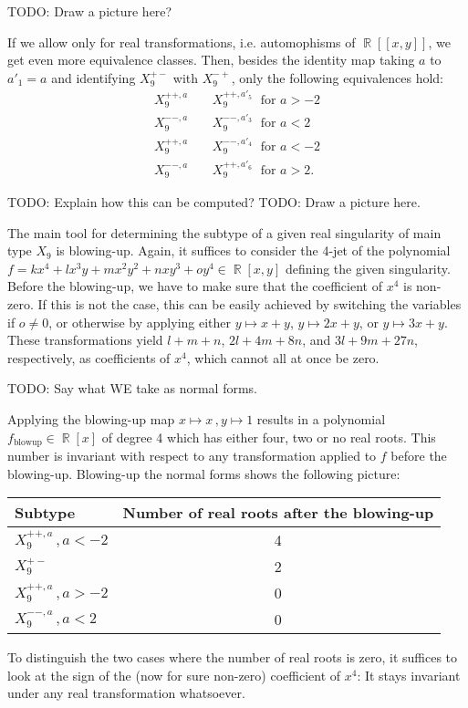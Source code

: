 \documentclass[noend]{amsproc}
\theoremstyle{definition}
\DeclareMathOperator{\requiv}{\overset{r}{\sim}}
\DeclareMathOperator{\R}{\mathbb{R}}
\begin{document}
TODO: Draw a picture here?

If we allow only for real transformations, i.e. automophisms of $\R[[x,y]]$,
we get even more equivalence classes. Then, besides the identity map taking $a$
to $a'_1=a$ and identifying $X_9^{+-}$ with $X_9^{-+}$,
only the following equivalences hold:
\begin{align}
X_9^{++,a} \; &\requiv \; X_9^{++,a'_5} \; \text{ for } a > -2 \\
X_9^{--,a} \; &\requiv \; X_9^{--,a'_3} \; \text{ for } a < 2 \\
X_9^{++,a} \; &\requiv \; X_9^{--,a'_4} \; \text{ for } a < -2 \\
X_9^{--,a} \; &\requiv \; X_9^{++,a'_6} \; \text{ for } a > 2.
\end{align}

TODO: Explain how this can be computed?
TODO: Draw a picture here.

The main tool for determining the subtype of a given real singularity of main
type $X_9$ is blowing-up. Again, it suffices to consider the 4-jet of the
polynomial $f = kx^4 + lx^3y + mx^2y^2 + nxy^3 + oy^4 \in \R[x, y]$ defining
the given singularity. Before the blowing-up, we have to make sure that the
coefficient of $x^4$ is non-zero. If this is not
the case, this can be easily achieved by switching the variables if
$o \neq 0$, or otherwise by applying either $y \mapsto x+y$, $y \mapsto 2x+y$,
or $y \mapsto 3x+y$. These transformations yield $l+m+n$, $2l+4m+8n$, and
$3l+9m+27n$, respectively, as coefficients of $x^4$, which cannot all at once
be zero.

TODO: Say what WE take as normal forms.

Applying the blowing-up map $x \mapsto x \,, y \mapsto 1$ results in a
polynomial $f_{\text{blowup}} \in \R[x]$ of degree 4 which has either four, two
or no real roots. This number is invariant with respect to any transformation
applied to $f$ before the blowing-up. Blowing-up the normal forms shows the
following picture:

\begin{tabular}{l|c}
Subtype & Number of real roots after the blowing-up \\ \hline
$X_9^{++,a} \,, a < -2$ & 4 \\
$X_9^{+-}$ & 2 \\
$X_9^{++,a} \,, a > -2$ & 0 \\
$X_9^{--,a} \,, a < 2$ & 0
\end{tabular}

To distinguish the two cases where the number of real roots is zero, it
suffices to look at the sign of the (now for sure non-zero) coefficient of
$x^4$: It stays invariant under any real transformation whatsoever.
\end{document}
